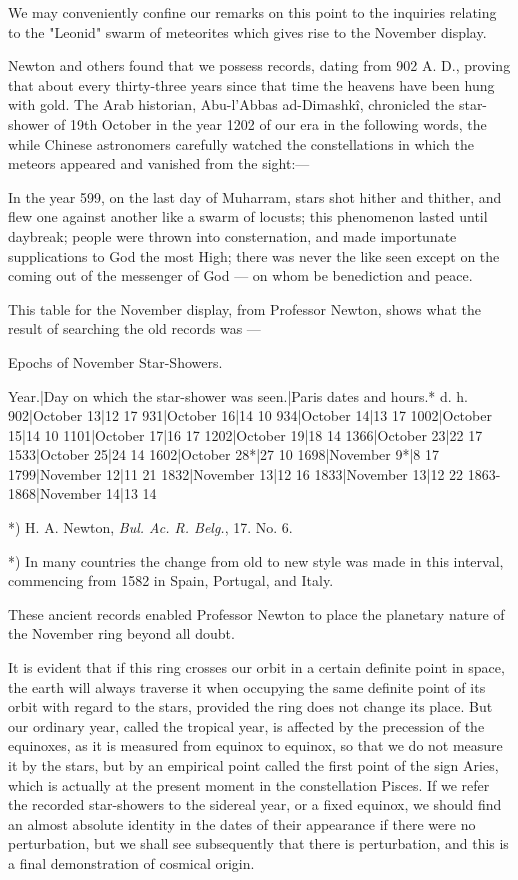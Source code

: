 \documentclass[a4paper, 12pt, oneside, polutonikogreek, english]{article}
\begin{document}
We may conveniently confine our remarks on this point to the inquiries relating to the "Leonid" swarm of meteorites which gives rise to the November display.

Newton and others found that we possess records, dating from 902 A. D., proving that about every thirty-three years since that time the heavens have been hung with gold. The Arab historian, Abu-l'Abbas ad-Dimashkî, chronicled the star-shower of 19th October in the year 1202 of our era in the following words, the while Chinese astronomers carefully watched the constellations in which the meteors appeared and vanished from the sight:---

In the year 599, on the last day of Muharram, stars shot hither and thither, and flew one against another like a swarm of locusts; this phenomenon lasted until daybreak; people were thrown into consternation, and made importunate supplications to God the most High; there was never the like seen except on the coming out of the messenger of God --- on whom be benediction and peace.

This table for the November display, from Professor Newton, shows what the result of searching the old records was ---

Epochs of November Star-Showers.

Year.|Day on which the star-shower was seen.|Paris dates and hours.* d. h. 
902|October 13|12 17 
931|October 16|14 10 
934|October 14|13 17 
1002|October 15|14 10 
1101|October 17|16 17 
1202|October 19|18 14 
1366|October 23|22 17 
1533|October 25|24 14 
1602|October 28*|27 10 
1698|November 9*|8 17 
1799|November 12|11 21 
1832|November 13|12 16 
1833|November 13|12 22 
1863-1868|November 14|13 14 

*) H. A. Newton, \emph{Bul. Ac. R. Belg.}, 17. No. 6.

*) In many countries the change from old to new style was made in this interval, commencing from 1582 in Spain, Portugal, and Italy.

These ancient records enabled Professor Newton to place the planetary nature of the November ring beyond all doubt.

It is evident that if this ring crosses our orbit in a certain definite point in space, the earth will always traverse it when occupying the same definite point of its orbit with regard to the stars, provided the ring does not change its place. But our ordinary year, called the tropical year, is affected by the precession of the equinoxes, as it is measured from equinox to equinox, so that we do not measure it by the stars, but by an empirical point called the first point of the sign Aries, which is actually at the present moment in the constellation Pisces. If we refer the recorded star-showers to the sidereal year, or a fixed equinox, we should find an almost absolute identity in the dates of their appearance if there were no perturbation, but we shall see subsequently that there is perturbation, and this is a final demonstration of cosmical origin.
\end{document}
